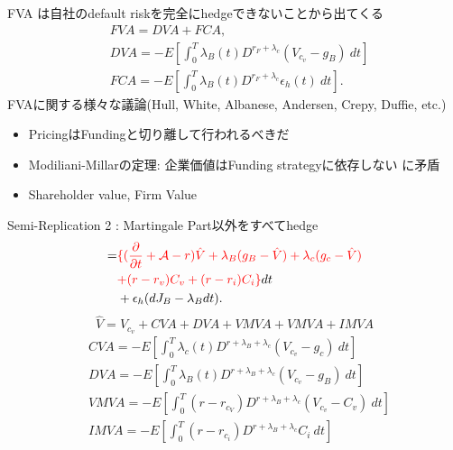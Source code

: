 \documentclass[driverfallback=dvipdfmx,cjk]{beamer}
\begin{document}
\begin{frame}
    FVA は自社のdefault riskを完全にhedgeできないことから出てくる
   \begin{align*}
    &FVA = DVA + FCA, \\
    &DVA = -E[\int_0^T \lambda_B(t) D^{r_F + \lambda_c}(V_{c_v}-g_B) \ dt]\\
    &FCA = -E[\int_0^T \lambda_B(t) D^{r_F + \lambda_c}\epsilon_h(t) \ dt].
   \end{align*}
   FVAに関する様々な議論(Hull, White, Albanese, Andersen, Crepy, Duffie, etc.)
   \begin{itemize}
        \item PricingはFundingと切り離して行われるべきだ
        \item Modiliani-Millarの定理: 企業価値はFunding strategyに依存しない に矛盾
        \item Shareholder value, Firm Value
   \end{itemize}

\end{frame}

\begin{frame}
    Semi-Replication 2 : Martingale Part以外をすべてhedge
    \begin{align*}
    = &\textcolor{red}{\{ (\frac{\partial }{ \partial t} + \mathcal{A} -r ) \hat{V} + \lambda_B(g_B - \hat{V}) + \lambda_c(g_c - \hat{V}) } \\
    & \textcolor{red}{+(r-r_v)C_v + (r- r_i) C_i \}} dt\\
    &  + \epsilon_h (d J_B - \lambda_B dt) .
   \end{align*}
   $$ \hat{V}= V_{c_v} + CVA + DVA + VMVA + VMVA + IMVA$$
   \begin{align*}
    &CVA = -E[\int_0^T \lambda_c(t) D^{r + \lambda_B + \lambda_c}(V_{c_v}-g_c) \ dt]\\
    &DVA = -E[\int_0^T \lambda_B(t) D^{r + \lambda_B + \lambda_c}(V_{c_v}-g_B) \ dt]\\
    &VMVA = -E[\int_0^T (r - r_{c_V}) D^{r + \lambda_B + \lambda_c}(V_{c_v}-C_v) \ dt]\\
    &IMVA = -E[\int_0^T (r - r_{c_i}) D^{r + \lambda_B + \lambda_c} C_i \  dt]
   \end{align*}

\end{frame}
\end{document}
